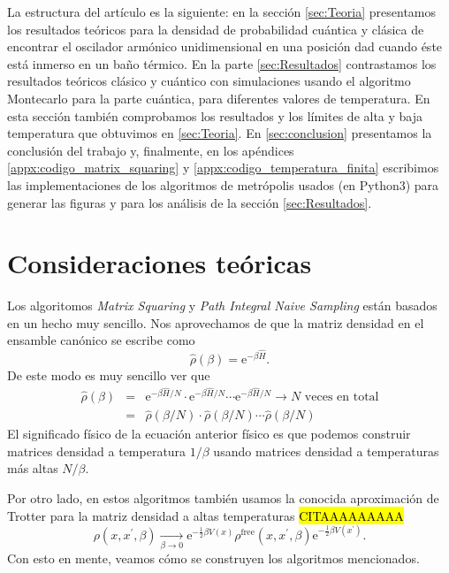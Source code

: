 \documentclass[%
 reprint,
 amsmath,amssymb,
 aps,
 pra,
]{revtex4-2}
\begin{document}
La estructura del artículo es la siguiente: en la sección \ref{sec:Teoria} presentamos los resultados teóricos para la densidad de probabilidad cuántica y clásica de encontrar el oscilador armónico unidimensional en una posición dad cuando éste está inmerso en un baño térmico. En la parte \ref{sec:Resultados} contrastamos los resultados teóricos clásico y cuántico con simulaciones usando el algoritmo Montecarlo para la parte cuántica, para diferentes valores de temperatura. En esta sección también comprobamos los resultados y los límites de alta y baja temperatura que obtuvimos en \ref{sec:Teoria}. En \ref{sec:conclusion} presentamos la conclusión del trabajo y, finalmente, en los apéndices \ref{appx:codigo_matrix_squaring} y \ref{appx:codigo_temperatura_finita} escribimos las implementaciones de los algoritmos de metrópolis usados (en Python3) para generar las figuras y para los análisis de la sección \ref{sec:Resultados}.


\section{\label{sec:Teoria}Consideraciones teóricas}

Los algoritomos \textit{Matrix Squaring} y \textit{Path Integral Naive Sampling} están basados en un hecho muy sencillo. Nos aprovechamos de que la matriz densidad en el ensamble canónico se escribe como 
\begin{equation}
	\hat{\rho}(\beta) = \mathrm{e}^{-\beta \hat{H}}.
\end{equation}
De este modo es muy sencillo ver que
\begin{eqnarray}
	\hat{\rho}(\beta) 	&=& \mathrm{e}^{-\beta\hat{H}/N} \cdot \mathrm{e}^{-\beta\hat{H}/N}  \cdots \mathrm{e}^{-\beta\hat{H}/N} \rightarrow \text{$N$ veces en total} \nonumber \\
						&=& \hat{\rho}(\beta/N) \cdot \hat{\rho}(\beta/N) \cdots \hat{\rho}(\beta/N) \label{eq:convolution} 
\end{eqnarray}
El significado físico de la ecuación anterior físico es que podemos construir matrices densidad a temperatura $1/\beta$ usando matrices densidad a temperaturas más altas $N/\beta$.
	

Por otro lado, en estos algoritmos también usamos la conocida aproximación de Trotter para la matriz densidad a altas temperaturas \hl{CITAAAAAAAAA}
\begin{equation}
	\rho\left(x, x^{\prime}, \beta\right) \underset{\beta \rightarrow 0}{\longrightarrow} \mathrm{e}^{-\frac{1}{2} \beta V(x)} \rho^{\mathrm{free}}\left(x, x^{\prime}, \beta\right) \mathrm{e}^{-\frac{1}{2} \beta V\left(x^{\prime}\right)}.
\end{equation}	
Con esto en mente, veamos cómo se construyen los algoritmos mencionados. 
\end{document}

